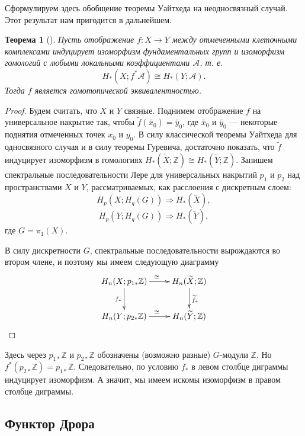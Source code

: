 \documentclass[14pt, dvipsnames]{extarticle}
\newtheorem{theorem}{Теорема}
\theoremstyle{definition}
\theoremstyle{remark}
\begin{document}
Сформулируем здесь обобщение теоремы Уайтхеда на неодносвязный случай. Этот результат нам пригодится в дальнейшем.

\begin{theorem}[\cite{QuillenHomAlg}]\label{WhiteheadNonSimplyConnected}
Пусть отображение $f: X\to Y$ между отмеченными клеточными комплексами индуцирует изоморфизм фундаментальных групп и изоморфизм гомологий с любыми локальными коэффициентами $\mathcal{A}$, т. е. $$H_\ast(X; f^\ast\mathcal{A})\cong H_\ast(Y; \mathcal{A}).$$ Тогда $f$ является гомотопической эквивалентностью.
\end{theorem}  

\begin{proof}
Будем считать, что $X$ и $Y$ связные. Поднимем отображение $f$ на универсальное накрытие так, чтобы $\widetilde{f}(\widetilde{x_0}) = \widetilde{y_0}$, где $\widetilde{x_0}$ и $\widetilde{y_0}$ --- некоторые поднятия отмеченных точек $x_0$ и $y_0$. В силу классической теоремы Уайтхеда для односвязного случая и в силу теоремы Гуревича, достаточно показать, что $\widetilde{f}$ индуцирует изоморфизм в гомологиях $H_\ast(\widetilde{X}; \mathbb{Z})\cong H_\ast(\widetilde{Y}; \mathbb{Z})$. Запишем спектральные последовательности Лере для универсальных накрытий $p_1$ и $p_2$ над пространствами $X$ и $Y$, рассматриваемых, как расслоения с дискретным слоем: $$H_p(X; H_q(G))\Rightarrow H_\ast(\widetilde{X}),$$ $$H_p(Y; H_q(G))\Rightarrow H_\ast(\widetilde{Y}),$$ где $G = \pi_1(X)$. 

В силу дискретности $G$, спектральные последовательности вырождаются во втором члене, и поэтому мы имеем следующую диаграмму $$\xymatrix{
    H_n(X; p_{1\ast}\mathbb{Z}) \ar[r]^{\cong} \ar[d]_{f_\ast} & H_n(\widetilde{X}; \mathbb{Z}) \ar[d]^{\widetilde{f}_\ast} \\
    H_n(Y; p_{2\ast}\mathbb{Z}) \ar[r]^{\cong}       & H_n(\widetilde{Y}; \mathbb{Z}) }$$    
\end{proof}

Здесь через $p_{1\ast}\mathbb{Z}$ и $p_{2\ast}\mathbb{Z}$ обозначены (возможно разные) $G$-модули $\mathbb{Z}$. Но $f^\ast (p_{2\ast}\mathbb{Z}) = p_{1\ast}\mathbb{Z}$. Следовательно, по условию $f_\ast$ в левом столбце диграммы индуцирует изоморфизм. А значит, мы имеем искомы изоморфизм в правом столбце диграммы. 



\subsection{Функтор Дрора}
\end{document}
